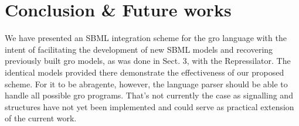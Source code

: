 \documentclass[12pt]{article}
\begin{document}
\section{Conclusion \& Future works}
    
    
    We have presented an SBML integration scheme for the gro language with the intent of facilitating the development of new SBML models and recovering previously built gro models, as was done in Sect. 3, with the Repressilator. The identical models provided there demonstrate the effectiveness of our proposed scheme. For it to be abragente, however, the language parser should be able to handle all possible gro programs. That's not currently the case as signalling and structures have not yet been implemented and could serve as practical extension of the current work.




\end{document}
